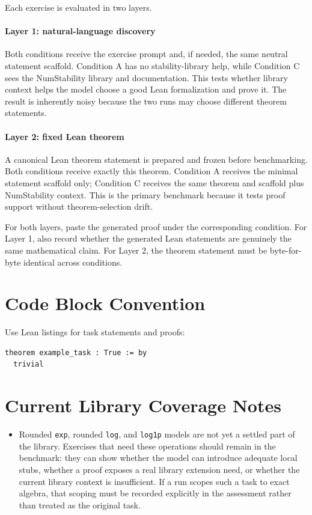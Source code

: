 \documentclass[11pt]{article}
\begin{document}
Each exercise is evaluated in two layers.

\paragraph{Layer 1: natural-language discovery}
Both conditions receive the exercise prompt and, if needed, the same neutral
statement scaffold.  Condition A has no stability-library help, while Condition
C sees the NumStability library and documentation.  This tests whether library
context helps the model choose a good Lean formalization and prove it.  The
result is inherently noisy because the two runs may choose different theorem
statements.

\paragraph{Layer 2: fixed Lean theorem}
A canonical Lean theorem statement is prepared and frozen before benchmarking.
Both conditions receive exactly this theorem.  Condition A receives the minimal
statement scaffold only; Condition C receives the same theorem and scaffold plus
NumStability context.  This is the primary benchmark because it tests proof
support without theorem-selection drift.

For both layers, paste the generated proof under the corresponding condition.
For Layer 1, also record whether the generated Lean statements are genuinely
the same mathematical claim.  For Layer 2, the theorem statement must be byte-for-byte
identical across conditions.

\section{Code Block Convention}

Use Lean listings for task statements and proofs:

\begin{lstlisting}
theorem example_task : True := by
  trivial
\end{lstlisting}

\section{Current Library Coverage Notes}

\begin{itemize}
  \item Rounded \texttt{exp}, rounded \texttt{log}, and \texttt{log1p} models are
  not yet a settled part of the library.  Exercises that need these operations
  should remain in the benchmark: they can show whether the model can introduce
  adequate local stubs, whether a proof exposes a real library extension need,
  or whether the current library context is insufficient.  If a run scopes such
  a task to exact algebra, that scoping must be recorded explicitly in the
  assessment rather than treated as the original task.
\end{itemize}
\end{document}

